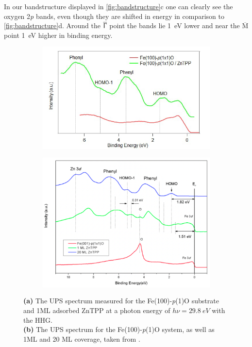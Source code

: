 In our bandstructure displayed in \autoref{fig:bandstructure}c one can clearly see the oxygen 2\textit{p} bands, even though they are shifted in energy in comparison to \autoref{fig:bandstructure}d. Around the $\overline{\Upgamma}$ point the bands lie \qty{1}{eV} lower and near the $\overline{\text{M}}$ point \qty{1}{eV} higher in binding energy.





\begin{figure}[h]
    \centering
    \begin{subfigure}{0.49\textwidth}
        \centering
        \includegraphics[width = \textwidth]{Plots/integrated_spectrum_Fe.png}
        \caption{}
        \label{fig:ups_spectrum}
    \end{subfigure}
    \hfill
    \begin{subfigure}{0.49\textwidth}
        \centering
        \includegraphics[width = \textwidth]{Plots/integrated_spectrum_Fe_lit.png}
        \caption{}
        \label{fig:ups_spectrum_lit}
    \end{subfigure}
    \caption{\textbf{(a)} The UPS spectrum measured for the Fe(100)-\textit{p}(1)O substrate and 1ML adsorbed ZnTPP at a photon energy of $h\nu = \qty{29.8}{eV}$ with the HHG. \\\textbf{(b)} The UPS spectrum for the Fe(100)-\textit{p}(1)O system, as well as 1ML and 20 ML coverage, taken from \cite*{tesi}.}
    \label{fig:ups}
\end{figure}
